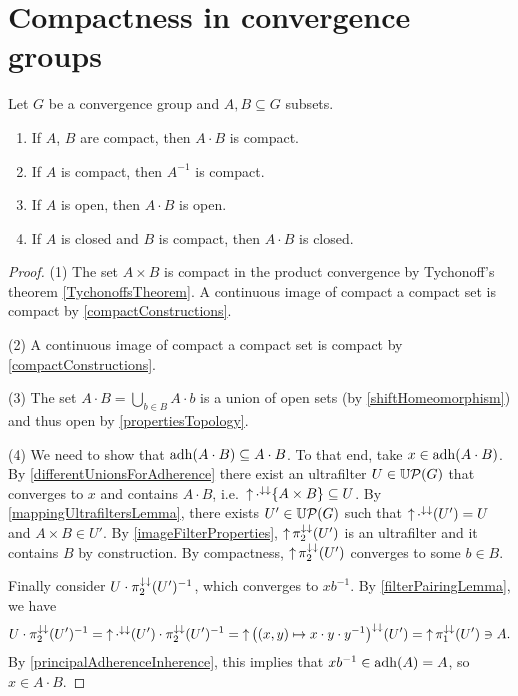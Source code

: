 \section{Compactness in convergence groups}
\begin{proposition}
Let $G$ be a convergence group and $A,B\subseteq G$ subsets.
\begin{enumerate} \label{compactSubsetsConvergenceGroups}
\item If $A$, $B$ are compact, then $A\cdot B$ is compact.
\item If $A$ is compact, then $A^{-1}$ is compact.
\item If $A$ is open, then $A\cdot B$ is open.
\item If $A$ is closed and $B$ is compact, then $A\cdot B$ is closed.
\end{enumerate}
\end{proposition}
\begin{proof}
(1) The set $A\times B$ is compact in the product convergence by Tychonoff's theorem \ref{TychonoffsTheorem}. A continuous image of compact a compact set is compact by \ref{compactConstructions}.

(2) A continuous image of compact a compact set is compact by \ref{compactConstructions}.

(3) The set $A\cdot B = \bigcup_{b\in B} A\cdot b$ is a union of open sets (by \ref{shiftHomeomorphism}) and thus open by \ref{propertiesTopology}.

(4) We need to show that $\operatorname{adh}(A\cdot B) \subseteq A\cdot B$. To that end, take $x\in \operatorname{adh}(A\cdot B)$. By \ref{differentUnionsForAdherence} there exist an ultrafilter $U\in \operatorname{\mathbb{U}\mathcal{P}}(G)$ that converges to $x$ and contains $A\cdot B$, i.e.\ $\operatorname{\uparrow}\cdot^{\downarrow\downarrow}\{A\times B\} \subseteq U$. By \ref{mappingUltrafiltersLemma}, there exists $U'\in \operatorname{\mathbb{U}\mathcal{P}}(G)$ such that $\operatorname{\uparrow}\cdot^{\downarrow\downarrow}(U') = U$ and $A\times B \in U'$. By \ref{imageFilterProperties}, $\operatorname{\uparrow} \pi_2^{\downarrow\downarrow}(U')$ is an ultrafilter and it contains $B$ by construction.
By compactness, $\operatorname{\uparrow} \pi_2^{\downarrow\downarrow}(U')$ converges to some $b\in B$.

Finally consider $U\cdot \pi_2^{\downarrow\downarrow}(U')^{-1}$, which converges to $xb^{-1}$. By \ref{filterPairingLemma}, we have
\[ U\cdot \pi_2^{\downarrow\downarrow}(U')^{-1} = \operatorname{\uparrow}\cdot^{\downarrow\downarrow}(U')\cdot \pi_2^{\downarrow\downarrow}(U')^{-1} = \operatorname{\uparrow} \big((x,y)\mapsto x\cdot y \cdot y^{-1}\big)^{\downarrow\downarrow}(U') = \operatorname{\uparrow} \pi_1^{\downarrow\downarrow}(U') \ni A. \]
By \ref{principalAdherenceInherence}, this implies that $xb^{-1}\in \operatorname{adh}(A) = A$, so $x\in A\cdot B$.
\end{proof}


